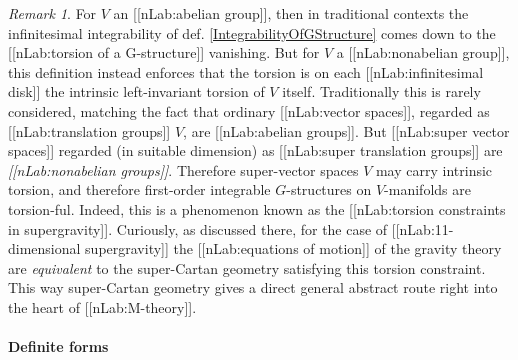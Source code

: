 \documentclass[12pt,titlepage]{article}
\theoremstyle{plain}
\theoremstyle{definition}
\theoremstyle{remark}
\newtheorem{remark}{Remark}
\begin{document}
\begin{remark}
\label{TorsionConstraints}\hypertarget{TorsionConstraints}{}
For $V$ an [[nLab:abelian group]], then in traditional contexts the infinitesimal integrability of def. \ref{IntegrabilityOfGStructure} comes down to the [[nLab:torsion of a G-structure]] vanishing. But for $V$ a [[nLab:nonabelian group]], this definition instead enforces that the torsion is on each [[nLab:infinitesimal disk]] the intrinsic left-invariant torsion of $V$ itself.
Traditionally this is rarely considered, matching the fact that ordinary [[nLab:vector spaces]], regarded as [[nLab:translation groups]] $V$, are [[nLab:abelian groups]]. But [[nLab:super vector spaces]] regarded (in suitable dimension) as [[nLab:super translation groups]] are \emph{[[nLab:nonabelian groups]]}. Therefore super-vector spaces $V$ may carry intrinsic torsion, and therefore first-order integrable $G$-structures on $V$-manifolds are torsion-ful.
Indeed, this is a phenomenon known as the [[nLab:torsion constraints in supergravity]]. Curiously, as discussed there, for the case of [[nLab:11-dimensional supergravity]] the [[nLab:equations of motion]] of the gravity theory are \emph{equivalent} to the super-Cartan geometry satisfying this torsion constraint. This way super-Cartan geometry gives a direct general abstract route right into the heart of [[nLab:M-theory]].
\end{remark}
\hypertarget{definite_forms}{}\paragraph*{{Definite forms}}\label{definite_forms}
\end{document}
